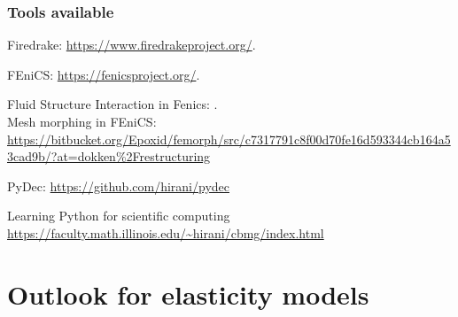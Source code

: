 \documentclass{beamer}
\begin{document}
\begin{frame}\frametitle{Tools available}
	Firedrake: \url{https://www.firedrakeproject.org/}. \\
	\vspace{.1cm}
	
	FEniCS: \url{https://fenicsproject.org/}. \\
	\vspace{.1cm}
	
	Fluid Structure Interaction in Fenics: \cite{bergersen2020fenics}. \\
	\vspace{.1cm}
	Mesh morphing in FEniCS: \url{https://bitbucket.org/Epoxid/femorph/src/c7317791c8f00d70fe16d593344cb164a53cad9b/?at=dokken\%2Frestructuring} \\
	\vspace{.1cm}	
	
	PyDec: \url{https://github.com/hirani/pydec} \\
	\vspace{.1cm}
	
	Learning Python for scientific computing \url{https://faculty.math.illinois.edu/~hirani/cbmg/index.html}
\end{frame}


\section{Outlook for elasticity models}
\end{document}
